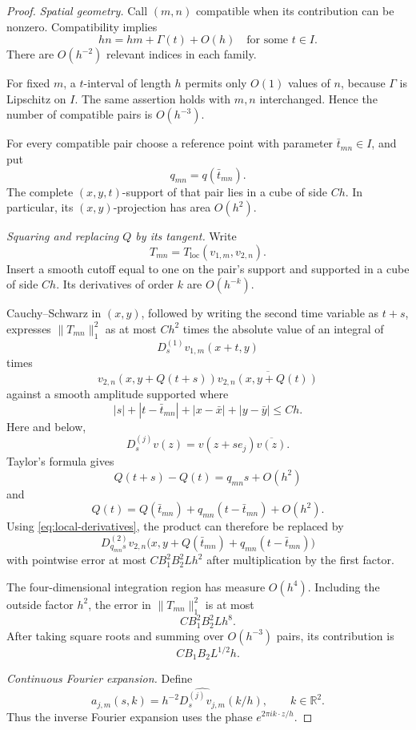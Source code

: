 \documentclass[11pt,a4paper]{article}
\newcommand{\R}{\mathbb R}
\begin{document}
\begin{proof}
\textit{Spatial geometry.}
Call $(m,n)$ compatible when its contribution can be nonzero.
Compatibility implies
\[
hn=hm+\Gamma(t)+O(h)\quad\text{for some }t\in I.
\tag{5.6}\label{eq:compatible-pairs}
\]
There are $O(h^{-2})$ relevant indices in each family.

For fixed $m$, a $t$-interval of length $h$ permits only $O(1)$ values of
$n$, because $\Gamma$ is Lipschitz on $I$. The same assertion holds with
$m,n$ interchanged. Hence the number of compatible pairs is $O(h^{-3})$.

For every compatible pair choose a reference point with parameter
$\bar t_{mn}\in I$, and put
\[
q_{mn}=q(\bar t_{mn}).
\]
The complete $(x,y,t)$-support of that pair lies in a cube of side $Ch$.
In particular, its $(x,y)$-projection has area $O(h^2)$.

\medskip
\noindent\textit{Squaring and replacing $Q$ by its tangent.}
Write
\[
T_{mn}=T_{\mathrm{loc}}(v_{1,m},v_{2,n}).
\]
Insert a smooth cutoff equal to one on the pair's support and supported
in a cube of side $Ch$. Its derivatives of order $k$ are $O(h^{-k})$.

Cauchy--Schwarz in $(x,y)$, followed by writing the second time variable
as $t+s$, expresses $\|T_{mn}\|_1^2$ as at most $Ch^2$ times the absolute
value of an integral of
\[
D_s^{(1)}v_{1,m}(x+t,y)
\]
times
\[
v_{2,n}(x,y+Q(t+s))\overline{v_{2,n}(x,y+Q(t))}
\]
against a smooth amplitude supported where
\[
|s|+|t-\bar t_{mn}|+|x-\bar x|+|y-\bar y|\leq Ch.
\]
Here and below,
\[
D_s^{(j)}v(z)=v(z+se_j)\overline{v(z)}.
\]
Taylor's formula gives
\[
Q(t+s)-Q(t)=q_{mn}s+O(h^2)
\]
and
\[
Q(t)=Q(\bar t_{mn})+q_{mn}(t-\bar t_{mn})+O(h^2).
\]
Using \eqref{eq:local-derivatives}, the product can therefore be replaced by
\[
D_{q_{mn}s}^{(2)}v_{2,n}
\bigl(x,y+Q(\bar t_{mn})+q_{mn}(t-\bar t_{mn})\bigr)
\]
with pointwise error at most $CB_1^2B_2^2Lh^2$ after multiplication by the
first factor.

The four-dimensional integration region has measure $O(h^4)$. Including
the outside factor $h^2$, the error in $\|T_{mn}\|_1^2$ is at most
\[
CB_1^2B_2^2Lh^8.
\]
After taking square roots and summing over $O(h^{-3})$ pairs, its
contribution is
\[
CB_1B_2L^{1/2}h.
\tag{5.7}\label{eq:tangent-error}
\]

\medskip
\noindent\textit{Continuous Fourier expansion.}
Define
\[
a_{j,m}(s,k)=h^{-2}\widehat{D_s^{(j)}v_{j,m}}(k/h),
\qquad k\in\R^2.
\tag{5.8}\label{eq:correlation-fourier}
\]
Thus the inverse Fourier expansion uses the phase $e^{2\pi i k\cdot z/h}$.


\end{proof}
\end{document}

